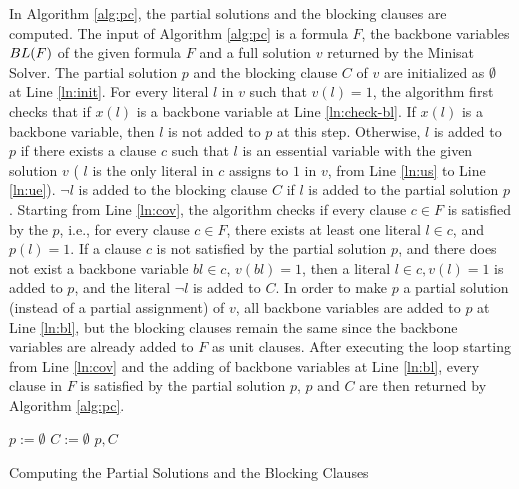 In Algorithm \ref{alg:pc}, the partial solutions and the blocking clauses are computed. 
The input of Algorithm \ref{alg:pc} is a formula $F$, the backbone variables ${\sc BL}(F)$ of the given formula $F$ and a full solution $v$ returned by the Minisat Solver.
The partial solution $p$ and the blocking clause $C$ of $v$ are initialized as $\emptyset$ at Line \ref{ln:init}.
For every literal $l$ in $v$ such that $v(l)=1$, the algorithm first checks that if $x(l)$ is a backbone variable at Line \ref{ln:check-bl}. If $x(l)$ is a backbone variable, then $l$ is not added to $p$ at this step. Otherwise, $l$ is added to $p$ if there exists a clause $c$ such that $l$ is an essential variable with the given solution $v$ ( $l$ is the only literal in $c$ assigns to $1$ in $v$, from Line \ref{ln:us} to Line \ref{ln:ue}). $\neg l$ is added to the blocking clause $C$ if $l$ is added to the partial solution $p$. 
Starting from Line \ref{ln:cov}, the algorithm checks if every clause $c\in F$ is satisfied by the $p$, i.e., for every clause $c\in F$, there exists at least one literal $l\in c$, and $p(l)=1$. If a clause $c$ is not satisfied by the partial solution $p$, and there does not exist a backbone variable $bl\in c$, $v(bl)=1$, then a literal $l\in c, v(l)=1$ is added to $p$, and the literal $\neg l$ is added to $C$. 
In order to make $p$ a partial solution (instead of a partial assignment) of $v$, all backbone variables are added to $p$ at Line \ref{ln:bl}, but the blocking clauses remain the same since the backbone variables are already added to $F$ as unit clauses.
After executing the loop starting from Line \ref{ln:cov} and the adding of backbone variables at Line \ref{ln:bl}, every clause in $F$ is satisfied by the partial solution $p$, $p$ and $C$ are then returned by Algorithm \ref{alg:pc}.
\begin{algorithm}
\SetAlgoShortEnd
\SetFillComment
{}
$p:=\emptyset$\;
$C:=\emptyset$\; \label{ln:init}
\Return $p, C$\;
\caption{Computing the Partial Solutions and the Blocking Clauses}\label{alg:pc}
\end{algorithm}

